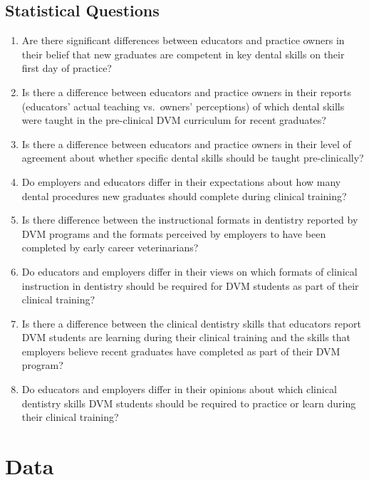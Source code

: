 \documentclass[
  11pt,
  letterpaper,
  DIV=11,
  numbers=noendperiod]{scrartcl}
\begin{document}
\hypertarget{statistical-questions}{%
\subsection{Statistical Questions}\label{statistical-questions}}

\begin{enumerate}
\def\labelenumi{\arabic{enumi}.}
\item
  Are there significant differences between educators and practice
  owners in their belief that new graduates are competent in key dental
  skills on their first day of practice?
\item
  Is there a difference between educators and practice owners in their
  reports (educators' actual teaching vs.~owners' perceptions) of which
  dental skills were taught in the pre-clinical DVM curriculum for
  recent graduates?
\item
  Is there a difference between educators and practice owners in their
  level of agreement about whether specific dental skills should be
  taught pre-clinically?
\item
  Do employers and educators differ in their expectations about how many
  dental procedures new graduates should complete during clinical
  training?
\item
  Is there difference between the instructional formats in dentistry
  reported by DVM programs and the formats perceived by employers to
  have been completed by early career veterinarians?
\item
  Do educators and employers differ in their views on which formats of
  clinical instruction in dentistry should be required for DVM students
  as part of their clinical training?
\item
  Is there a difference between the clinical dentistry skills that
  educators report DVM students are learning during their clinical
  training and the skills that employers believe recent graduates have
  completed as part of their DVM program?
\item
  Do educators and employers differ in their opinions about which
  clinical dentistry skills DVM students should be required to practice
  or learn during their clinical training?
\end{enumerate}

\hypertarget{data}{%
\section{Data}\label{data}}
\end{document}
